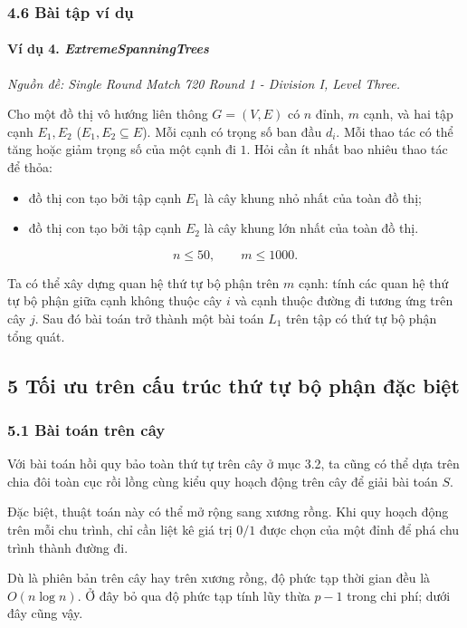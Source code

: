\documentclass[11pt]{article}
\begin{document}
\subsubsection*{4.6 Bài tập ví dụ}

\paragraph{Ví dụ 4. \emph{ExtremeSpanningTrees}}
\noindent\emph{Nguồn đề: Single Round Match 720 Round 1 - Division I, Level
Three.}

Cho một đồ thị vô hướng liên thông \(G=(V,E)\) có \(n\) đỉnh, \(m\) cạnh, và hai
tập cạnh \(E_1,E_2\) (\(E_1,E_2\subseteq E\)). Mỗi cạnh có trọng số ban đầu
\(d_i\). Mỗi thao tác có thể tăng hoặc giảm trọng số của một cạnh đi \(1\). Hỏi
cần ít nhất bao nhiêu thao tác để thỏa:
\begin{itemize}
  \item đồ thị con tạo bởi tập cạnh \(E_1\) là cây khung nhỏ nhất của toàn đồ
  thị;
  \item đồ thị con tạo bởi tập cạnh \(E_2\) là cây khung lớn nhất của toàn đồ
  thị.
\end{itemize}
\[
  n\le 50,\qquad m\le 1000.
\]

Ta có thể xây dựng quan hệ thứ tự bộ phận trên \(m\) cạnh: tính các quan hệ thứ
tự bộ phận giữa cạnh không thuộc cây \(i\) và cạnh thuộc đường đi tương ứng trên
cây \(j\). Sau đó bài toán trở thành một bài toán \(L_1\) trên tập có thứ tự bộ
phận tổng quát.

\subsection*{5 Tối ưu trên cấu trúc thứ tự bộ phận đặc biệt}

\subsubsection*{5.1 Bài toán trên cây}

Với bài toán hồi quy bảo toàn thứ tự trên cây ở mục 3.2, ta cũng có thể dựa
trên chia đôi toàn cục rồi lồng cùng kiểu quy hoạch động trên cây để giải bài
toán \(S\).

Đặc biệt, thuật toán này có thể mở rộng sang xương rồng. Khi quy hoạch động
trên mỗi chu trình, chỉ cần liệt kê giá trị \(0/1\) được chọn của một đỉnh để
phá chu trình thành đường đi.

Dù là phiên bản trên cây hay trên xương rồng, độ phức tạp thời gian đều là
\(O(n\log n)\). Ở đây bỏ qua độ phức tạp tính lũy thừa \(p-1\) trong chi phí;
dưới đây cũng vậy.
\end{document}
